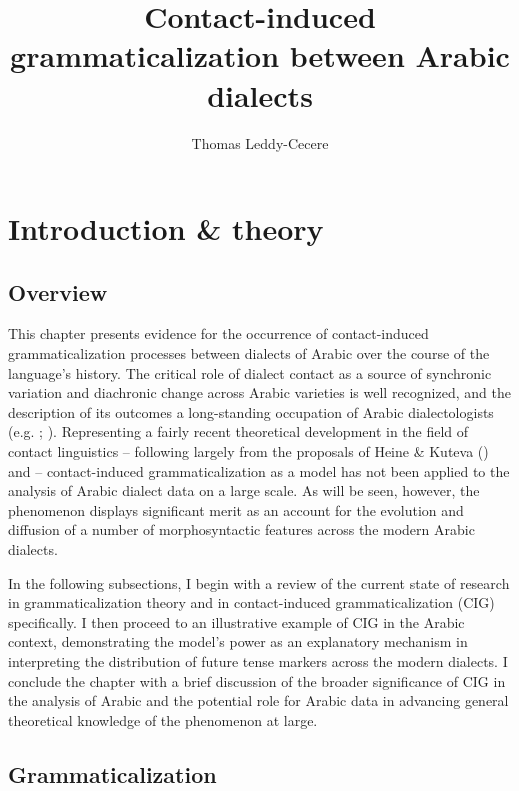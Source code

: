 \documentclass[output=paper]{langsci/langscibook}
\author{Thomas Leddy-Cecere\affiliation{Bennington College}}
\title{Contact-induced grammaticalization between Arabic dialects}
\begin{document}
\maketitle
 
 
\section{ Introduction \& theory}

\subsection{ Overview}


This chapter presents evidence for the occurrence of contact-induced grammaticalization processes between dialects of Arabic over the course of the language’s history. The critical role of dialect contact as a source of synchronic variation and diachronic change across Arabic varieties is well recognized, and the description of its outcomes a long-standing occupation of Arabic dialectologists (e.g. \citealt{BehnstedtWoidich2005}; \citealt{Miller2007}). Representing a fairly recent theoretical development in the field of contact linguistics – following largely from the proposals of Heine \& Kuteva (\citeyear{HeineKuteva2003,HeineKuteva2005}) and \citet{Dahl2001} – contact-induced grammaticalization as a model has not been applied to the analysis of Arabic dialect data on a large scale. As will be seen, however, the phenomenon displays significant merit as an account for the evolution and diffusion of a number of morphosyntactic features across the modern Arabic dialects. 

In the following subsections, I begin with a review of the current state of research in grammaticalization theory and in contact-induced grammaticalization (CIG) specifically. I then proceed to an illustrative example of CIG in the Arabic context, demonstrating the model’s power as an explanatory mechanism in interpreting the distribution of future tense markers across the modern dialects. I conclude the chapter with a brief discussion of the broader significance of CIG in the analysis of Arabic and the potential role for Arabic data in advancing general theoretical knowledge of the phenomenon at large.

\subsection{ Grammaticalization}\label{sec:gram}
\end{document}

